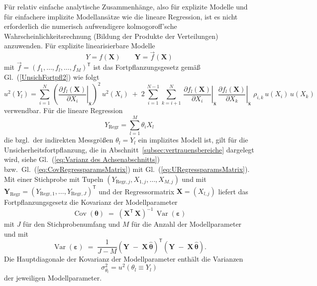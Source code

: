 Für relativ einfache analytische Zusammenhänge, also für explizite Modelle
und für ein\-fachere implizite Modellansätze wie die lineare Regression, ist
es nicht erforderlich die numerisch aufwendigere
kolmogoroff'sche Wahrscheinlichkeitsrechnung (Bildung
der Produkte der Verteilungen) anzuwenden.
Für explizite linearisierbare Modelle
$$
Y = f(\mathbf{X}) \qquad \mathbf{Y} = \vec f(\mathbf{X})
$$
mit $\vec f = (f_1,\dots,f_l, \dots, f_M)^\mathsf{T}$ ist das
Fortpflanzungsgesetz gemäß Gl.~(\ref{UnsichFortpfl2}) wie folgt
\begin{equation}
u^2(Y_l) = \sum\limits_{i=1}^{N} \, \left( \left. \frac{\partial f_l(\mathbf{X})}{\partial X_i}\right|_{\bar{\mathbf{x}}} \right)^2 \, u^2(X_i) \;  + \;
2 \, \sum\limits_{i=1}^{{N-1}}
 \sum\limits_{k=i+1}^{N} \, \left. \frac{\partial f_l(\mathbf{X})}{\partial X_i}\right|_{\bar{\mathbf{x}}} \,
 \left. \frac{\partial f_l(\mathbf{X})}{\partial X_k}\right|_{\bar{\mathbf{x}}}  \; \rho_{i,k} \, u(X_i) \, u(X_k)
\end{equation}
verwendbar. Für die lineare Regression
$$
Y_\mathrm{Regr} = \sum_{l=1}^M \theta_i X_l
$$
die bzgl.\ der indirekten Messgrößen $\theta_l = Y_l$ ein implizites Modell ist, gilt
für die Unsicherheitsfortpflanzung, die in Abschnitt~\ref{subsec:vertrauensbereiche}
dargelegt wird, siehe Gl.~(\ref{eq:Varianz des Achsenabschnitts}) bzw.\
Gl.~(\ref{eq:CovRegressparamsMatrix}) mit Gl.~(\ref{eq:URegressparamsMatrix}).
Mit einer Stichprobe mit Tupeln $(Y_{\mathrm{Regr},j}, X_{1,j},\dots,X_{M,j})$ und mit
$\boldsymbol Y_{\mathrm{Regr}} = (Y_{\mathrm{Regr},1},\dots,Y_{\mathrm{Regr},J})^{\mathsf{T}}$
und der Regressormatrix $\boldsymbol X = (X_{l,j})$ liefert das Fortpflanzungsgesetz die
Kovarianz der Modellparameter
\begin{equation}
\operatorname{Cov}(\boldsymbol \theta) \; = \; \left(\boldsymbol X^\mathsf{T} \, \boldsymbol X\right)^{-1} \, \operatorname{Var}(\boldsymbol \varepsilon)
\end{equation}
mit $J$ für den Stichprobenumfang und $M$ für die Anzahl der Modellparameter und mit
\begin{equation}
\operatorname{Var}(\boldsymbol \varepsilon) \; = \;
	\frac{1}{J-M}\left(\boldsymbol Y \; - \; \boldsymbol X \, \hat{\boldsymbol \theta}\right)^\mathsf{T}
\left(\boldsymbol Y \; - \; \boldsymbol X \, \hat{\boldsymbol \theta}\right) .
\end{equation}
Die Hauptdiagonale der Kovarianz der Modellparameter enthält die Varianzen
$$
\sigma_{\theta_l}^2 = u^2(\theta_l\equiv Y_l)
$$
der jeweiligen Modellparameter.

